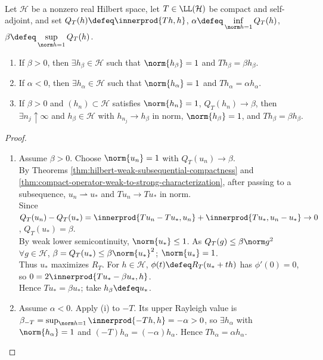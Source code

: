 \begin{corollary} \label{cor:compact-self-adjoint-extreme-rayleigh-eigenvalues} \\
Let $\mathcal{H}$ be a nonzero real Hilbert space, let $T\in\LL(\mathcal{H})$ be compact and self-adjoint, and set $Q_T(h)\defeq\innerprod{Th,h}$, $\alpha\defeq\inf\limits_{\norm h=1}Q_T(h)$, $\beta\defeq\sup\limits_{\norm h=1}Q_T(h)$.
\begin{enumerate}[label=(\roman*)]
\setlength{\itemsep}{0pt}
    \item If $\beta>0$, then $\exists h_\beta\in\mathcal H$ such that $\norm{h_\beta}=1$ and $Th_\beta=\beta h_\beta$.
    \item If $\alpha<0$, then $\exists h_\alpha\in\mathcal H$ such that $\norm{h_\alpha}=1$ and $Th_\alpha=\alpha h_\alpha$.
    \item If $\beta>0$ and $(h_n)\subset\mathcal H$ satisfies $\norm{h_n}=1$, $Q_T(h_n)\to\beta$, then $\exists n_j\uparrow\infty$ and $h_\beta\in\mathcal H$ with $h_{n_j}\to h_\beta$ in norm, $\norm{h_\beta}=1$, and $Th_\beta=\beta h_\beta$.
\end{enumerate}
\begin{proof}
\begin{enumerate}[label=(\roman*)]
\setlength{\itemsep}{0pt}
\item Assume $\beta>0$. Choose $\norm{u_n}=1$ with $Q_T(u_n)\to\beta$.\\
By Theorems \ref{thm:hilbert-weak-subsequential-compactness} and \ref{thm:compact-operator-weak-to-strong-characterization}, after passing to a subsequence, $u_n\rightharpoonup u_*$ and $Tu_n\to Tu_*$ in norm.\\
Since $Q_T(u_n)-Q_T(u_*)=\innerprod{Tu_n-Tu_*,u_n}+\innerprod{Tu_*,u_n-u_*}\to0$, $Q_T(u_*)=\beta$.\\
By weak lower semicontinuity, $\norm{u_*}\leq1$. As $Q_T(g)\leq\beta\norm g^2$ $\forall g\in\mathcal H$, $\beta=Q_T(u_*)\leq\beta\norm{u_*}^2$; $\norm{u_*}=1$.\\
Thus $u_*$ maximizes $R_T$. For $h\in\mathcal H$, $\phi(t)\defeq R_T(u_*+t h)$ has $\phi'(0)=0$, so $0=2\innerprod{Tu_*-\beta u_*,h}$.\\
Hence $Tu_*=\beta u_*$; take $h_\beta\defeq u_*$.
\item Assume $\alpha<0$. Apply (i) to $-T$. Its upper Rayleigh value is $\beta_{-T}=\sup_{\norm h=1}\innerprod{-Th,h}=-\alpha>0$, so $\exists h_\alpha$ with $\norm{h_\alpha}=1$ and $(-T)h_\alpha=(-\alpha)h_\alpha$. Hence $Th_\alpha=\alpha h_\alpha$.

\end{enumerate}
\end{proof}
\end{corollary}
